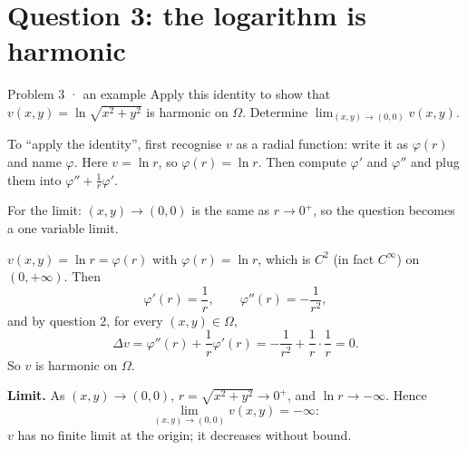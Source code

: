 \section{Question 3: the logarithm is harmonic}

\begin{question}{Problem 3 \;·\; an example}
Apply this identity to show that $v(x,y)=\ln\sqrt{x^2+y^2}$ is harmonic on $\Omega$.
Determine $\displaystyle\lim_{(x,y)\to(0,0)}v(x,y)$.
\end{question}

\begin{lesson}
To ``apply the identity'', first recognise $v$ as a radial function: write it as $\varphi(r)$ and name
$\varphi$. Here $v=\ln r$, so $\varphi(r)=\ln r$. Then compute $\varphi'$ and $\varphi''$ and plug them into
$\varphi''+\frac1r\varphi'$.

For the limit: $(x,y)\to(0,0)$ is the same as $r\to0^+$, so the question becomes a one variable limit.
\end{lesson}

\begin{answer}
$v(x,y)=\ln r=\varphi(r)$ with $\varphi(r)=\ln r$, which is $C^2$ (in fact $C^\infty$) on $(0,+\infty)$.
Then
\[
  \varphi'(r)=\frac1r,\qquad \varphi''(r)=-\frac1{r^2},
\]
and by question 2, for every $(x,y)\in\Omega$,
\[
  \Delta v=\varphi''(r)+\frac1r\varphi'(r)=-\frac1{r^2}+\frac1r\cdot\frac1r=0 .
\]
So $v$ is harmonic on $\Omega$.

\textbf{Limit.} As $(x,y)\to(0,0)$, $r=\sqrt{x^2+y^2}\to0^+$, and $\ln r\to-\infty$. Hence
\[
  \lim_{(x,y)\to(0,0)}v(x,y)=-\infty :
\]
$v$ has no finite limit at the origin; it decreases without bound.
\end{answer}

\begin{center}
\end{center}

